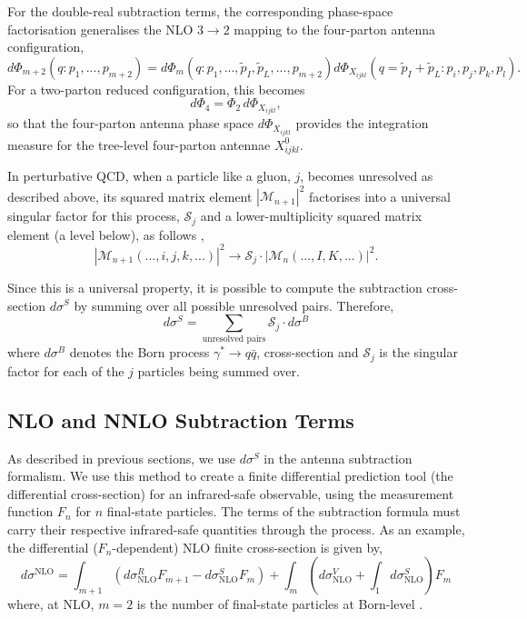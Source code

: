 For the double-real subtraction terms, the corresponding phase-space
factorisation generalises the NLO $3\to2$ mapping to the four-parton antenna
configuration,
\begin{equation}\label{eq:nnloPhaseSpaceFactor}
    d\Phi_{m+2}(q:p_1,...,p_{m+2}) = d\Phi_m(q:p_1,...,\tilde p_I,\tilde p_L,...,p_{m+2})d\Phi_{X_{ijkl}}(q=\tilde p_I+\tilde p_L:p_i,p_j,p_k,p_l).
\end{equation}
For a two-parton reduced configuration, this becomes
\begin{equation}
    d\Phi_4 = \Phi_2\,d\Phi_{X_{ijkl}},
\end{equation}
so that the four-parton antenna phase space $d\Phi_{X_{ijkl}}$ provides the
integration measure for the tree-level four-parton antennae $X_{ijkl}^0$.

\iffalse
In perturbative QCD, when a particle like a gluon, $j$, becomes unresolved as 
described above, its squared matrix element $|\mathcal M_{n+1}|^2$ factorises
into a universal singular factor for this process, $\mathcal S_j$ and a lower-multiplicity squared 
matrix element (a level below), as follows \cite{Catani:1996vz, Gehrmann-DeRidder:2005btv},
\begin{equation}
    |\mathcal M_{n+1}(..., i, j, k, ...)|^2 \to \mathcal S_j\cdot|\mathcal M_n(...,I,K,...)|^2.
\end{equation}

Since this is a universal property, it is possible to compute the subtraction 
cross-section $d\sigma^S$ by summing over all possible unresolved pairs.
Therefore,
\begin{equation}\label{eq:sigmaSDef}
    d\sigma^S=\sum_\text{unresolved pairs}\mathcal S_j\cdot d\sigma^B
\end{equation}
where $d\sigma^B$ denotes the Born process $\gamma^*\to q\bar q$, cross-section and
$\mathcal S_j$ is the singular factor for each of the $j$ particles being summed 
over.


\subsection{NLO and NNLO Subtraction Terms}

As described in previous sections, we use $d\sigma^S$ in the antenna subtraction
formalism. We use this method to create a finite differential prediction tool
(the differential cross-section) for an infrared-safe observable, using the
measurement function $F_n$ for $n$ final-state particles. The terms
of the subtraction formula must carry their respective infrared-safe quantities through 
the process. As an example, the differential ($F_n$-dependent) NLO finite cross-section 
is given by,
\begin{equation}\label{eq:genSub}
    d\sigma^\text{NLO} = \int_{m+1}\left(d\sigma^R_\text{NLO} F_{m+1}-d\sigma^S_\text{NLO} F_m\right)+\int_m\left(d\sigma^V_\text{NLO}+\int_1 d\sigma^S_\text{NLO}\right)F_m
\end{equation}
where, at NLO, $m=2$ is the number of final-state particles at Born-level \cite{Ellis:1996mzs}.


